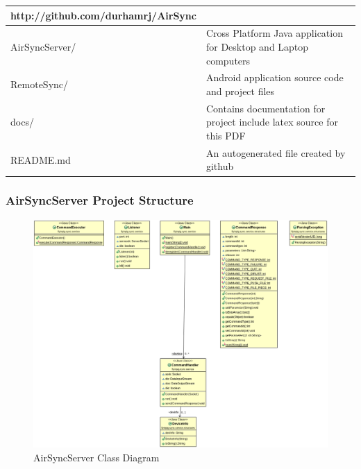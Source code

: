 \documentclass[12pt]{article}
\begin{document}
\begin{center}
\begin{tabular}{|l|p{7.5cm}|}
\hline
	\textbf{http://github.com/durhamrj/AirSync} \\
\hline
	AirSyncServer/ 
	& Cross Platform Java application for Desktop and Laptop computers\\
\hline 
	RemoteSync/
	& Android application source code and project files\\
\hline
	docs/
	& Contains documentation for project include latex source for this PDF\\
\hline
	README.md
	& An autogenerated file created by github\\
\hline
\end{tabular}
\end{center}

\subsubsection{AirSyncServer Project Structure}

\begin{figure}[h]
\includegraphics[width=1\textwidth]{class-diag.png}
\caption{AirSyncServer Class Diagram}
\end{figure}
\end{document}
